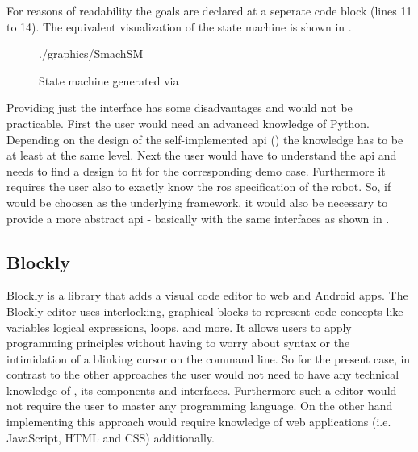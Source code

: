 For reasons of readability the goals are declared at a seperate code block (lines 11 to 14). The equivalent visualization of the state machine is shown in . \\

\begin{figure}[htbp]
	
\end{figure}

\begin{figure}[htbp]
	\centering
	\begin{overpic}[width=0.7\linewidth]{./graphics/SmachSM}
	\end{overpic}
	\caption{State machine generated via }%
	\label{fig:SmachSM}%
\end{figure}

Providing just the \smach{} interface has some disadvantages and would not be practicable. First the user would need an advanced knowledge of Python. Depending on the design of the self-implemented \gls{api} () the knowledge has to be at least at the same level. Next the user would have to understand the \gls{api} and needs to find a design to fit for the corresponding demo case. Furthermore it requires the user also to exactly know the \gls{ros} specification of the robot. So, if \smach{} would be choosen as the underlying framework, it would also be necessary to provide a more abstract \gls{api} - basically with the same interfaces as shown in .

\subsection{Blockly} \label{sub:Blockly}
Blockly is a library that adds a visual code editor to web and Android apps. The Blockly editor uses interlocking, graphical blocks to represent code concepts like variables logical expressions, loops, and more. It allows users to apply programming principles without having to worry about syntax or the intimidation of a blinking cursor on the command line. \cite{BlocklyIntro} So for the present case, in contrast to the other approaches the user would not need to have any technical knowledge of \hobbit{}, its components and interfaces. Furthermore such a editor would not require the user to master any programming language. On the other hand implementing this approach would require knowledge of web applications (i.e. JavaScript, HTML and CSS) additionally. \\

